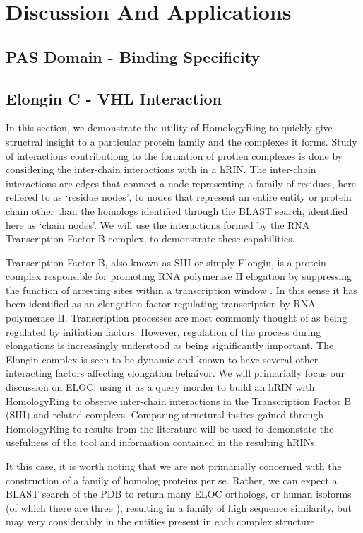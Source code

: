 \section{Discussion And Applications}
\subsection{PAS Domain - Binding Specificity}
\subsection{Elongin C - VHL Interaction}
In this section, we demonstrate the utility of HomologyRing to quickly give structral insight to a particular protein family and the complexes it forms. 
Study of interactions contributiong to the formation of protien complexes is done by considering the inter-chain interactions with in a hRIN. 
The inter-chain interactions are edges that connect a node representing a family of residues, here reffered to as `residue nodes', to nodes that represent an entire entity or protein chain other than the homologs identified through the BLAST search, identified here as `chain nodes'.
We will use the interactions formed by the RNA Transcription Factor B complex, to demonstrate these capabilities. 

Transcription Factor B, also known as SIII or simply Elongin, is a protein complex responsible for promoting RNA polymerase II elogation by suppressing the function of arresting sites within a transcription window \cite{Chen2023}. In this sense it has been identified as an elongation factor regulating transcription by RNA polymerase II. Transcription processes are most commonly thought of as being regulated by initiation factors. However, regulation of the process during elongations is increasingly understood as being significantly important. The Elongin complex is seen to be dynamic and known to have several other interacting factors affecting elongation behaivor. %
We will primarially focus our discussion on ELOC: using it as a query inorder to build an hRIN with HomologyRing to observe inter-chain interactions in the Transcription Factor B (SIII) and related complexs. 
Comparing structural insites gained through HomologyRing to results from the literature will be used to demonstate the usefulness of the tool and information contained in the resulting hRINs.  

It this case, it is worth noting that we are not primarially concerned with the construction of a family of homolog proteins per se. Rather, we can expect a BLAST search of the PDB to return many ELOC orthologs, or human isoforms (of which there are three \cite{Chen2023}), resulting in a family of high sequence similarity, but may very considerably in the entities present in each complex structure. %

